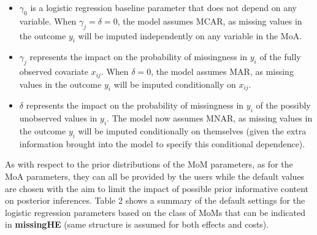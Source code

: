 \documentclass[]{article}
\begin{document}
\begin{itemize}
 \item{$\gamma_{0}$ is a logistic regression baseline parameter that does not depend on any variable. When $\gamma_{j}=\delta=0$, the model assumes MCAR, as missing values in the outcome $y_{i}$ will be imputed  independently on any variable in the MoA.}
 \item{$\gamma_{j}$ represents the impact on the probability of missingness in $y_{i}$ of the fully observed covariate $x_{ij}$. When $\delta=0$, the model assumes MAR, as missing values in the outcome $y_{i}$ will be imputed conditionally on $x_{ij}$.}
\item{$\delta$ represents the impact on the probability of missingness in $y_{i}$ of the possibly unobserved values in $y_{i}$. The model now assumes MNAR, as missing values in the outcome $y_{i}$ will be imputed conditionally on themselves (given the extra information brought into the model to specify this conditional dependence).}
\end{itemize}

As with respect to the prior distributions of the MoM parameters, as for
the MoA parameters, they can all be provided by the users while the
default values are chosen with the aim to limit the impact of possible
prior informative content on posterior inferences. Table 2 shows a
summary of the default settings for the logistic regression parameters
based on the class of MoMs that can be indicated in \textbf{missingHE}
(same structure is assumed for both effects and costs).

\begin{table}[H]
 \centering
 \caption{A list of the different MoM parameter specifications assumed in \textbf{missingHE} and the default prior distributions assigned. The names on the right-hand side of the table represent the name to be used in \textbf{missingHE} to provide user-defined priors in a similar way to what previously shown for the location and ancillary MoA parameters.}
  \end{table}
\end{document}

